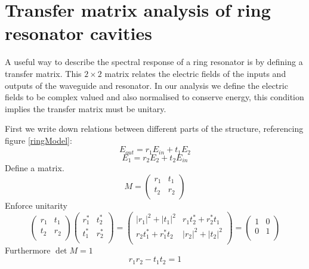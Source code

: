 \section{Transfer matrix analysis of ring resonator cavities}
\label{ringResAppen}
A useful way to describe the spectral response of a ring resonator is by defining a transfer matrix. This $2\times2$ matrix relates the electric fields of the inputs and outputs of the waveguide and resonator. In our analysis we define the electric fields to be complex valued and also normalised to conserve energy, this condition implies the transfer matrix must be unitary. 

First we write down relations between different parts of the structure, referencing figure \ref{ringModel}:
\begin{equation}
E_{out}=r_1E_{in}+t_1E_2
\end{equation}
\begin{equation}
E_{1}=r_2E_2+t_2E_{in}
\end{equation}
Define a matrix.
\begin{equation}
M = \begin{pmatrix}
r_1 & t_1 \\
t_2 & r_2 \\
\end{pmatrix}
\end{equation}
Enforce unitarity
\begin{equation}
\begin{pmatrix}
r_1 & t_1 \\
t_2 & r_2 \\
\end{pmatrix}
\begin{pmatrix}
r^*_1 & t^*_2 \\
t^*_1 & r^*_2 \\
\end{pmatrix}
=
\begin{pmatrix}
|r_1|^2+|t_1|^2 & r_1t^*_2+r^*_2t_1 \\
r_2t^*_1+r^*_1t_2 & |r_2|^2+|t_2|^2 \\
\end{pmatrix}=
\begin{pmatrix}
1 & 0 \\
0 & 1 \\
\end{pmatrix}
\end{equation}
Furthermore $\det{M}=1$
\begin{equation}
r_1r_2-t_1t_2=1
\end{equation}
